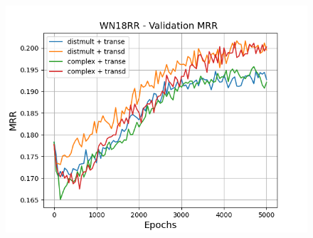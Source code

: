 \begin{figure}
\begin{minipage}{.3\textwidth}
    \end{minipage}
    \begin{minipage}{.3\textwidth}
      \centering
      \includegraphics[width=\linewidth]{figures/results/gan_train/pretrained/random/wn18rr/gan_train_random_wn18rr_mrrs.png}
    \end{minipage}%
    

\end{figure}

